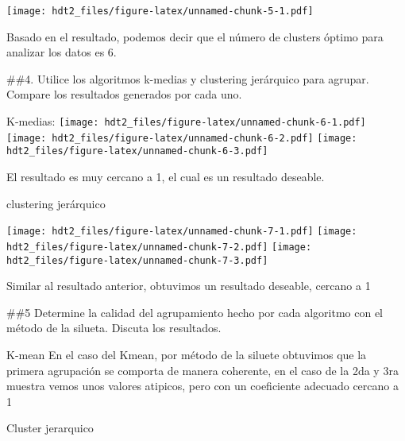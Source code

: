 \documentclass[
]{article}
\newenvironment{Shaded}{\begin{snugshade}}{\end{snugshade}}
\newcommand{\AttributeTok}[1]{\textcolor[rgb]{0.77,0.63,0.00}{#1}}
\newcommand{\ControlFlowTok}[1]{\textcolor[rgb]{0.13,0.29,0.53}{\textbf{#1}}}
\newcommand{\DecValTok}[1]{\textcolor[rgb]{0.00,0.00,0.81}{#1}}
\newcommand{\FunctionTok}[1]{\textcolor[rgb]{0.00,0.00,0.00}{#1}}
\newcommand{\NormalTok}[1]{#1}
\newcommand{\OtherTok}[1]{\textcolor[rgb]{0.56,0.35,0.01}{#1}}
\newcommand{\SpecialCharTok}[1]{\textcolor[rgb]{0.00,0.00,0.00}{#1}}
\newcommand{\StringTok}[1]{\textcolor[rgb]{0.31,0.60,0.02}{#1}}
\begin{document}
\begin{Shaded}
\end{Shaded}

\texttt{[image: hdt2\_files/figure-latex/unnamed-chunk-5-1.pdf]}

Basado en el resultado, podemos decir que el número de clusters óptimo
para analizar los datos es 6.

\#\#4. Utilice los algoritmos k-medias y clustering jerárquico para
agrupar. Compare los resultados generados por cada uno.

K-medias:
\texttt{[image: hdt2\_files/figure-latex/unnamed-chunk-6-1.pdf]}
\texttt{[image: hdt2\_files/figure-latex/unnamed-chunk-6-2.pdf]}
\texttt{[image: hdt2\_files/figure-latex/unnamed-chunk-6-3.pdf]}

El resultado es muy cercano a 1, el cual es un resultado deseable.

clustering jerárquico

\texttt{[image: hdt2\_files/figure-latex/unnamed-chunk-7-1.pdf]}
\texttt{[image: hdt2\_files/figure-latex/unnamed-chunk-7-2.pdf]}
\texttt{[image: hdt2\_files/figure-latex/unnamed-chunk-7-3.pdf]}

Similar al resultado anterior, obtuvimos un resultado deseable, cercano
a 1

\#\#5 Determine la calidad del agrupamiento hecho por cada algoritmo con
el método de la silueta. Discuta los resultados.

K-mean En el caso del Kmean, por método de la siluete obtuvimos que la
primera agrupación se comporta de manera coherente, en el caso de la 2da
y 3ra muestra vemos unos valores atipicos, pero con un coeficiente
adecuado cercano a 1

Cluster jerarquico
\end{document}
